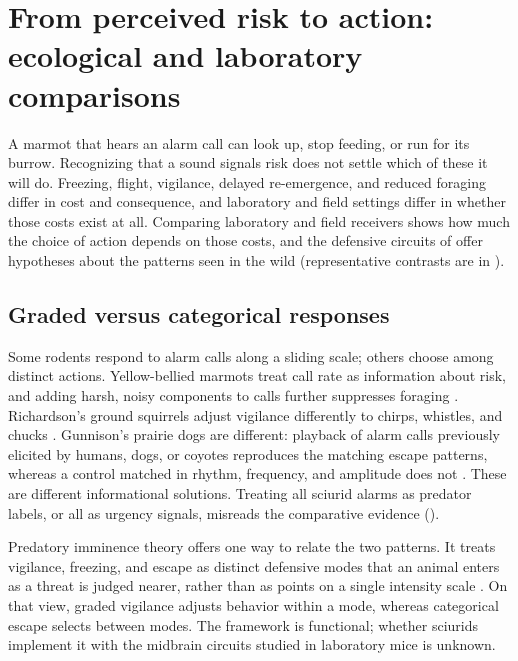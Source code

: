 \section{From perceived risk to action: ecological and laboratory comparisons}
\label{sec:action}

A marmot that hears an alarm call can look up, stop feeding, or run for its burrow. Recognizing that a sound signals risk does not settle which of these it will do. Freezing, flight, vigilance, delayed re-emergence, and reduced foraging differ in cost and consequence, and laboratory and field settings differ in whether those costs exist at all. Comparing laboratory and field receivers shows how much the choice of action depends on those costs, and the defensive circuits of  offer hypotheses about the patterns seen in the wild (representative contrasts are in ).

\subsection{Graded versus categorical responses}
\label{sec:action-graded}

Some rodents respond to alarm calls along a sliding scale; others choose among distinct actions. Yellow-bellied marmots treat call rate as information about risk, and adding harsh, noisy components to calls further suppresses foraging \citep{BlumsteinArmitage1997,BlumsteinRecapet2009}. Richardson's ground squirrels adjust vigilance differently to chirps, whistles, and chucks \citep{SloanEtAl2005}. Gunnison's prairie dogs are different: playback of alarm calls previously elicited by humans, dogs, or coyotes reproduces the matching escape patterns, whereas a control matched in rhythm, frequency, and amplitude does not \citep{KiriazisSlobodchikoff2006}. These are different informational solutions. Treating all sciurid alarms as predator labels, or all as urgency signals, misreads the comparative evidence ().

Predatory imminence theory offers one way to relate the two patterns. It treats vigilance, freezing, and escape as distinct defensive modes that an animal enters as a threat is judged nearer, rather than as points on a single intensity scale \citep{Fanselow1994}. On that view, graded vigilance adjusts behavior within a mode, whereas categorical escape selects between modes. The framework is functional; whether sciurids implement it with the midbrain circuits studied in laboratory mice is unknown.

